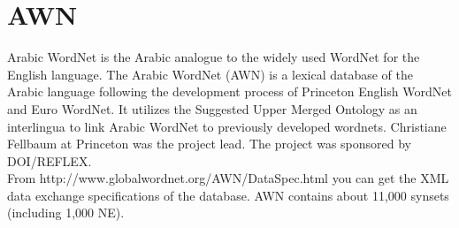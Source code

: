 \section{AWN}
Arabic WordNet is the Arabic analogue to the widely used WordNet for the English language. The Arabic WordNet (AWN) is a lexical database of the Arabic language following the development process of Princeton English WordNet and Euro WordNet. It utilizes the Suggested Upper Merged Ontology as an interlingua to link Arabic WordNet to previously developed wordnets. Christiane Fellbaum at Princeton was the project lead. The project was sponsored by DOI/REFLEX.\\
From http://www.globalwordnet.org/AWN/DataSpec.html you can get the XML data exchange specifications of the database. AWN contains about 11,000 synsets (including 1,000 NE).\\

